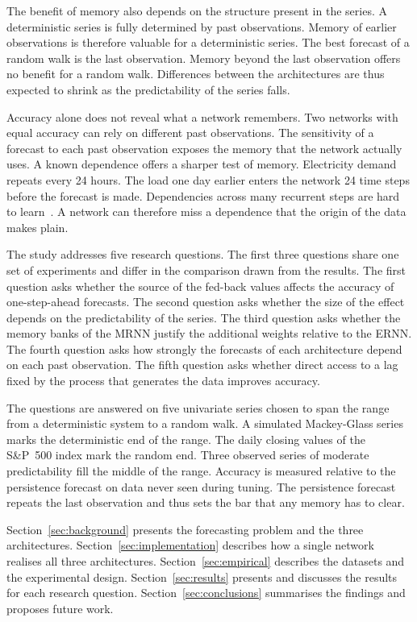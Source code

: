 \documentclass[conference,10pt]{IEEEtran}
\begin{document}
The benefit of memory also depends on the structure present in the
series.
A deterministic series is fully determined by past observations.
Memory of earlier observations is therefore valuable for a
deterministic series.
The best forecast of a random walk is the last observation.
Memory beyond the last observation offers no benefit for a random walk.
Differences between the architectures are thus expected to shrink as the
predictability of the series falls.

Accuracy alone does not reveal what a network remembers.
Two networks with equal accuracy can rely on different past
observations.
The sensitivity of a forecast to each past observation exposes the
memory that the network actually uses.
A known dependence offers a sharper test of memory.
Electricity demand repeats every 24 hours.
The load one day earlier enters the network 24 time steps before the
forecast is made.
Dependencies across many recurrent steps are hard to
learn~\cite{bengio1994}.
A network can therefore miss a dependence that the origin of the data
makes plain.  

The study addresses five research questions.
The first three questions share one set of experiments and differ in
the comparison drawn from the results.
The first question asks whether the source of the fed-back values
affects the accuracy of one-step-ahead forecasts.
The second question asks whether the size of the effect depends on the
predictability of the series.
The third question asks whether the memory banks of the MRNN justify
the additional weights relative to the ERNN.
The fourth question asks how strongly the forecasts of each
architecture depend on each past observation.
The fifth question asks whether direct access to a lag fixed by the
process that generates the data improves accuracy.

The questions are answered on five univariate series chosen to span the
range from a deterministic system to a random walk.
A simulated Mackey-Glass series marks the deterministic end of the
range.
The daily closing values of the S\&P~500 index mark the random end.
Three observed series of moderate predictability fill the middle of the
range.
Accuracy is measured relative to the persistence forecast on data never
seen during tuning.
The persistence forecast repeats the last observation and thus sets the
bar that any memory has to clear.

Section~\ref{sec:background} presents the forecasting problem and the
three architectures.
Section~\ref{sec:implementation} describes how a single network
realises all three architectures.
Section~\ref{sec:empirical} describes the datasets and the experimental
design.
Section~\ref{sec:results} presents and discusses the results for each
research question.
Section~\ref{sec:conclusions} summarises the findings and proposes
future work.
\end{document}
